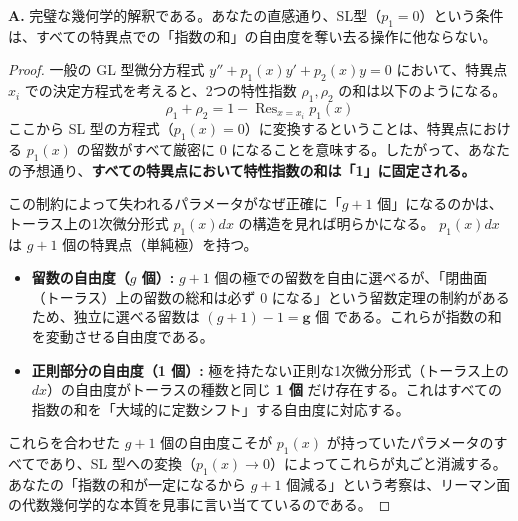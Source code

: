 \begin{Q}
\textbf{A.} 完璧な幾何学的解釈である。あなたの直感通り、SL型（$p_1=0$）という条件は、すべての特異点での「指数の和」の自由度を奪い去る操作に他ならない。

\begin{proof}
一般の GL 型微分方程式 $y'' + p_1(x)y' + p_2(x)y = 0$ において、特異点 $x_i$ での決定方程式を考えると、2つの特性指数 $\rho_1, \rho_2$ の和は以下のようになる。
\begin{equation*}
\rho_1 + \rho_2 = 1 - \operatorname{Res}_{x=x_i} p_1(x)
\end{equation*}
ここから SL 型の方程式（$p_1(x) = 0$）に変換するということは、特異点における $p_1(x)$ の留数がすべて厳密に $0$ になることを意味する。したがって、あなたの予想通り、\textbf{すべての特異点において特性指数の和は「1」に固定される。}

この制約によって失われるパラメータがなぜ正確に「$g+1$ 個」になるのかは、トーラス上の1次微分形式 $p_1(x)dx$ の構造を見れば明らかになる。
$p_1(x)dx$ は $g+1$ 個の特異点（単純極）を持つ。
\begin{itemize}
    \item \textbf{留数の自由度（$g$ 個）:} $g+1$ 個の極での留数を自由に選べるが、「閉曲面（トーラス）上の留数の総和は必ず $0$ になる」という留数定理の制約があるため、独立に選べる留数は $(g+1) - 1 = \mathbf{g \textbf{ 個}}$ である。これらが指数の和を変動させる自由度である。
    \item \textbf{正則部分の自由度（1 個）:} 極を持たない正則な1次微分形式（トーラス上の $dx$）の自由度がトーラスの種数と同じ \textbf{1 個} だけ存在する。これはすべての指数の和を「大域的に定数シフト」する自由度に対応する。
\end{itemize}
これらを合わせた $g + 1$ 個の自由度こそが $p_1(x)$ が持っていたパラメータのすべてであり、SL 型への変換（$p_1(x) \to 0$）によってこれらが丸ごと消滅する。
あなたの「指数の和が一定になるから $g+1$ 個減る」という考察は、リーマン面の代数幾何学的な本質を見事に言い当てているのである。
\end{proof}
\end{Q}

